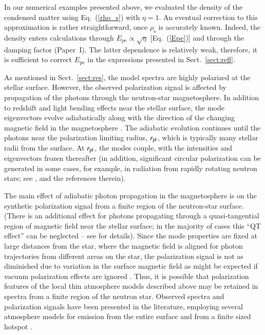 \documentclass{aa}
\newcommand{\req}[1]{Eq.~(\ref{#1})}
\newcommand{\Epe}{E_\mathrm{pe}}
\begin{document}
In our numerical examples presented above, we evaluated the
density of the condensed matter using \req{rho_s} with
$\eta=1$. An eventual correction to this approximation is
rather straightforward, once $\rho_\mathrm{s}$ is accurately
known. Indeed, the density enters calculations through
$\Epe\propto\sqrt{\eta}$ [\req{Epe}] and through the damping
factor (Paper~I). The latter dependence is relatively weak,
therefore, it is sufficient to correct $\Epe$ in the
expressions presented in Sect.~\ref{sect:refl}.

As mentioned in Sect.~\ref{sect:res}, the model spectra are
highly polarized at the stellar surface. However, the
observed polarization signal is affected by propagation of
the photons through the neutron-star magnetosphere. In
addition to redshift and light bending effects near the
stellar surface, the mode eigenvectors evolve adiabatically
along with the direction of the changing magnetic field in
the magnetosphere \citep[see, e.g.,][]{HeylShaviv02}. The
adiabatic evolution continues until the photons near the
polarization limiting radius, $r_{\rm pl}$, which is
typically many stellar radii from the surface.  At $r_{\rm
pl}$, the modes couple, with the intensities and
eigenvectors frozen thereafter (in addition, significant
circular polarization can be generated in some cases, for
example, in radiation from rapidly rotating neutron stars;
see \citealp{vanAdelsbergLai06}, and the references
therein).

The main effect of adiabatic photon propagation in the
magnetosphere is on the synthetic polarization signal from a
finite region of the neutron-star surface. (There is an
additional effect for photons propagating through a
quasi-tangential region of magnetic field near the stellar
surface; in the majority of cases this ``QT effect'' can be
neglected -- see \citealp{WangLai09} for details). Since the
mode properties are fixed at large distances from the star,
where the magnetic field is aligned for photon trajectories
from different areas on the star, the polarization signal is
not as diminished due to variation in the surface magnetic
field as might be expected if vacuum polarization effects
are ignored \citep[see][]{HeylShaviv02,Heyl-ea03}. 
Thus, it is possible that polarization features of the local
thin atmosphere models described above may be retained in
spectra from a finite region of the neutron star.  Observed spectra
and polarization signals have been presented in the
literature, employing several atmosphere models for
emission from the entire surface \citep{Heyl-ea03} and
from a finite sized hotspot \citep{vanAdelsbergPerna09}.
\end{document}
